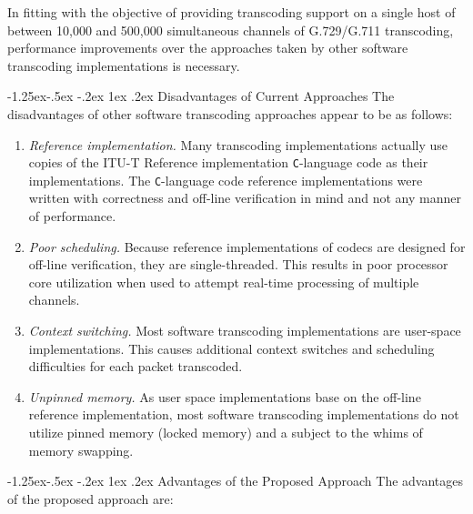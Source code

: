 \documentclass[letterpaper,final,notitlepage,twocolumn,10pt,twoside]{article}
\makeatletter
\let\normalsize = \small
\let\small = \footnotesize
\let\footnotesize = \scriptsize
\let\scriptsize = \tiny
\renewcommand\subsubsection{\@startsection{subsubsection}{3}{\z@}%
                                     {-1.25ex\@plus -.5ex \@minus -.2ex}%
                                     {1ex \@plus .2ex}%
                                     {\normalfont\normalsize\bfseries}}
\makeatother
\begin{document}
In fitting with the objective of providing transcoding support on a single host
of between 10,000 and 500,000 simultaneous channels of G.729/G.711 transcoding,
performance improvements over the approaches taken by other software transcoding
implementations is necessary.

\subsubsection{Disadvantages of Current Approaches}
The disadvantages of other software transcoding approaches appear to be as
follows:

\begin{enumerate}

\item{\it Reference implementation.}  Many transcoding implementations
actually use copies of the ITU-T Reference implementation {\tt C}-language
code as their implementations.  The {\tt C}-language code reference
implementations were written with correctness and off-line verification in
mind and not any manner of performance.

\item{\it Poor scheduling.}  Because reference implementations of codecs are
designed for off-line verification, they are single-threaded.  This results
in poor processor core utilization when used to attempt real-time processing
of multiple channels.

\item{\it Context switching.} Most software transcoding implementations are
user-space implementations.  This causes additional context switches and
scheduling difficulties for each packet transcoded.

\item{\it Unpinned memory.}  As user space implementations base on the
off-line reference implementation, most software transcoding implementations
do not utilize pinned memory (locked memory) and a subject to the whims of
memory swapping.

\end{enumerate}

\subsubsection{Advantages of the Proposed Approach}
The advantages of the proposed approach are:
\end{document}
